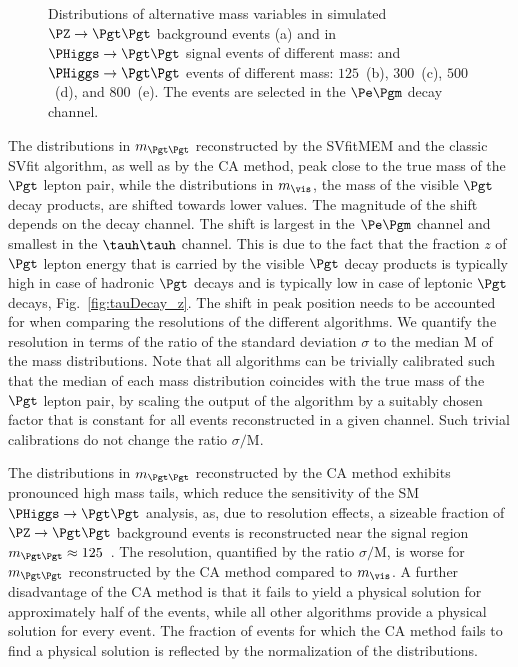 {{{{{\begin{figure}
\begin{center}
\end{center}
\caption{
  Distributions of alternative mass variables in simulated $\PZ \to \Pgt\Pgt$ background events (a) 
  and in $\PHiggs \to \Pgt\Pgt$ signal events of different mass:
  and $\PHiggs \to \Pgt\Pgt$ events of different mass:
  $125$~\GeV (b), $300$~\GeV (c), $500$~\GeV (d), and $800$~\GeV (e).
  The events are selected in the $\Pe\Pgm$ decay channel.
}
\label{fig:massDistributions_mssm_emu}
\end{figure}

The distributions in $m_{\Pgt\Pgt}$ reconstructed by the SVfitMEM and the classic SVfit algorithm,
as well as by the CA method, peak close to the true mass of the $\Pgt$ lepton pair,
while the distributions in $m_{\vis}$,
the mass of the visible $\Pgt$ decay products,
are shifted towards lower values.
The magnitude of the shift depends on the decay channel.
The shift is largest in the $\Pe\Pgm$ channel and smallest in the $\tauh\tauh$ channel.
This is due to the fact that the fraction $z$ of $\Pgt$ lepton energy that is carried by the visible $\Pgt$ decay products
is typically high in case of hadronic $\Pgt$ decays and is typically low in case of leptonic $\Pgt$ decays,
\cf Fig.~\ref{fig:tauDecay_z}.
The shift in peak position needs to be accounted for when comparing the resolutions of the different algorithms.
We quantify the resolution in terms of the ratio
of the standard deviation $\sigma$ to the median $\textrm{M}$
of the mass distributions.
Note that all algorithms can be trivially calibrated such that the median of each mass distribution coincides with the true mass of the $\Pgt$ lepton pair,
by scaling the output of the algorithm by a suitably chosen factor that is constant for all events reconstructed in a given channel.
Such trivial calibrations do not change the ratio $\sigma/\textrm{M}$.

The distributions in $m_{\Pgt\Pgt}$ reconstructed by the CA method
exhibits pronounced high mass tails, which reduce the sensitivity of the SM $\PHiggs \to \Pgt\Pgt$ analysis,
as, due to resolution effects, a sizeable fraction of $\PZ \to \Pgt\Pgt$ background events
is reconstructed near the signal region $m_{\Pgt\Pgt} \approx 125$~\GeV.
The resolution, quantified by the ratio $\sigma/\textrm{M}$,
is worse for $m_{\Pgt\Pgt}$ reconstructed by the CA method compared to $m_{\vis}$.
A further disadvantage of the CA method is that it fails to yield a physical solution for approximately half of the events,
while all other algorithms provide a physical solution for every event.
The fraction of events for which the CA method fails to find a physical solution is reflected by the normalization of the distributions.

}}}}}
